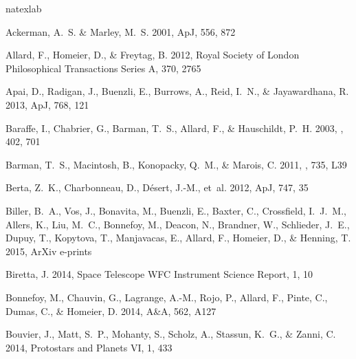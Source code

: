 \documentclass[apj]{emulateapj}
\begin{document}
% 
\begin{thebibliography}{52}
\expandafter\ifx\csname natexlab\endcsname\relax\def\natexlab#1{#1}\fi

Ackerman, A.~S. \& Marley, M.~S. 2001, ApJ, 556, 872

{Allard}, F., {Homeier}, D., \& {Freytag}, B. 2012, Royal Society of London
  Philosophical Transactions Series A, 370, 2765

Apai, D., Radigan, J., Buenzli, E., Burrows, A., Reid, I.~N., \& Jayawardhana,
  R. 2013, ApJ, 768, 121

{Baraffe}, I., {Chabrier}, G., {Barman}, T.~S., {Allard}, F., \& {Hauschildt},
  P.~H. 2003, \aap, 402, 701

{Barman}, T.~S., {Macintosh}, B., {Konopacky}, Q.~M., \& {Marois}, C. 2011,
  \apjl, 735, L39

Berta, Z.~K., Charbonneau, D., D\'{e}sert, J.-M., {et~al.} 2012, ApJ, 747, 35

{Biller}, B.~A., {Vos}, J., {Bonavita}, M., {Buenzli}, E., {Baxter}, C.,
  {Crossfield}, I.~J.~M., {Allers}, K., {Liu}, M.~C., {Bonnefoy}, M., {Deacon},
  N., {Brandner}, W., {Schlieder}, J.~E., {Dupuy}, T., {Kopytova}, T.,
  {Manjavacas}, E., {Allard}, F., {Homeier}, D., \& {Henning}, T. 2015, ArXiv
  e-prints

Biretta, J. 2014, Space Telescope WFC Instrument Science Report, 1, 10

Bonnefoy, M., Chauvin, G., Lagrange, A.-M., Rojo, P., Allard, F., Pinte, C.,
  Dumas, C., \& Homeier, D. 2014, A\&A, 562, A127

Bouvier, J., Matt, S.~P., Mohanty, S., Scholz, A., Stassun, K.~G., \& Zanni, C.
  2014, Protostars and Planets VI, 1, 433


\end{thebibliography}
\end{document}
